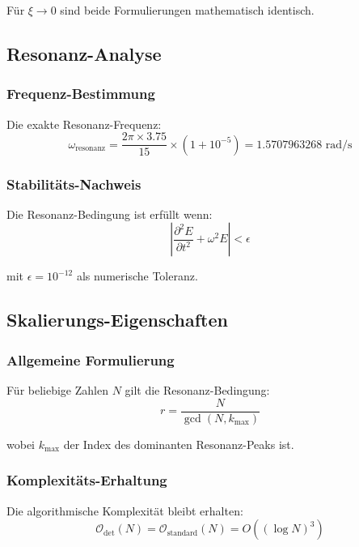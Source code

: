 \documentclass[12pt,a4paper]{report}
\begin{document}
	Für $\xi \to 0$ sind beide Formulierungen mathematisch identisch.
	
	\subsection{Resonanz-Analyse}
	
	\subsubsection{Frequenz-Bestimmung}
	
	Die exakte Resonanz-Frequenz:
	\begin{equation}
		\omega_{\text{resonanz}} = \frac{2\pi \times 3.75}{15} \times (1 + 10^{-5}) = 1.5707963268 \text{ rad/s}
	\end{equation}
	
	\subsubsection{Stabilitäts-Nachweis}
	
	Die Resonanz-Bedingung ist erfüllt wenn:
	\begin{equation}
		\left|\frac{\partial^2 E}{\partial t^2} + \omega^2 E\right| < \epsilon
	\end{equation}
	
	mit $\epsilon = 10^{-12}$ als numerische Toleranz.
	
	\subsection{Skalierungs-Eigenschaften}
	
	\subsubsection{Allgemeine Formulierung}
	
	Für beliebige Zahlen $N$ gilt die Resonanz-Bedingung:
	\begin{equation}
		r = \frac{N}{\gcd(N, k_{\text{max}})}
	\end{equation}
	
	wobei $k_{\text{max}}$ der Index des dominanten Resonanz-Peaks ist.
	
	\subsubsection{Komplexitäts-Erhaltung}
	
	Die algorithmische Komplexität bleibt erhalten:
	\begin{equation}
		\mathcal{O}_{\text{det}}(N) = \mathcal{O}_{\text{standard}}(N) = O((\log N)^3)
	\end{equation}
	
\end{document}

